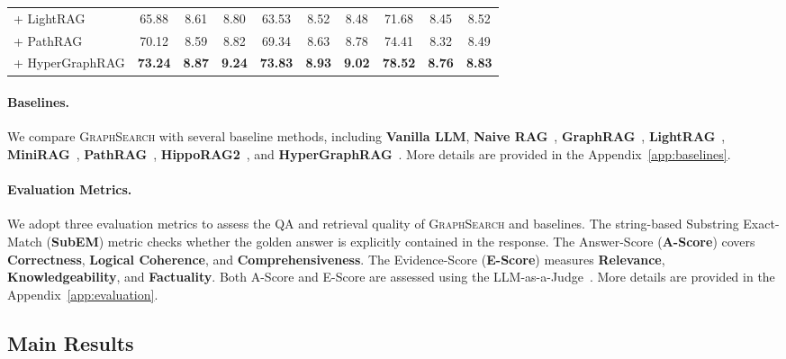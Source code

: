 \begin{table}[t]
\begin{center}
\begin{tabular}{lccccccccc}
+ LightRAG       & 65.88 & 8.61 & 8.80 & 63.53 & 8.52 & 8.48 & 71.68 & 8.45 & 8.52 \\
\rowcolor{gray!20}
+ PathRAG        & 70.12 & 8.59 & 8.82 & 69.34 & 8.63 & 8.78 & 74.41 & 8.32 & 8.49 \\
\rowcolor{gray!20}
+ HyperGraphRAG  & \textbf{73.24} & \textbf{8.87} & \textbf{9.24} & \textbf{73.83} & \textbf{8.93} & \textbf{9.02} & \textbf{78.52} & \textbf{8.76} & \textbf{8.83} \\
\bottomrule
\end{tabular}
\vspace{-20pt}
\end{center}
\end{table}

\paragraph{Baselines.} 
We compare \textsc{GraphSearch} with several baseline methods, including \textbf{Vanilla LLM}, \textbf{Naive RAG}~\citep{rag}, \textbf{GraphRAG}~\citep{graphrag}, \textbf{LightRAG}~\citep{lightrag}, \textbf{MiniRAG}~\citep{minirag}, \textbf{PathRAG}~\cite{pathrag}, \textbf{HippoRAG2}~\citep{hipporag2}, and \textbf{HyperGraphRAG}~\citep{hypergraphrag}. More details are provided in the Appendix~\ref{app:baselines}.

\paragraph{Evaluation Metrics.} 
We adopt three evaluation metrics to assess the QA and retrieval quality of \textsc{GraphSearch} and baselines. The string-based Substring Exact-Match (\textbf{SubEM}) metric checks whether the golden answer is explicitly contained in the response. The Answer-Score (\textbf{A-Score}) covers \textbf{Correctness}, \textbf{Logical Coherence}, and \textbf{Comprehensiveness}. The Evidence-Score (\textbf{E-Score}) measures \textbf{Relevance}, \textbf{Knowledgeability}, and \textbf{Factuality}. Both A-Score and E-Score are assessed using the LLM-as-a-Judge~\citep{llm-as-a-judge}. More details are provided in the Appendix~\ref{app:evaluation}.

\subsection{Main Results}

